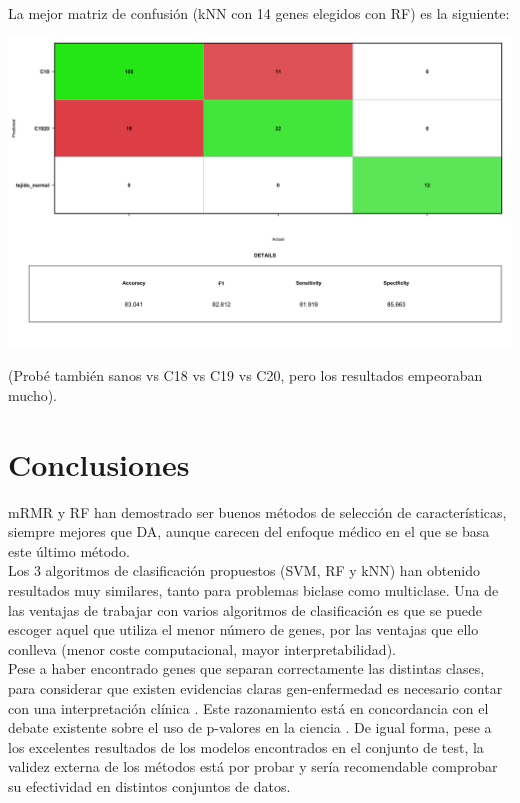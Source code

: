 La mejor matriz de confusión (kNN con 14 genes elegidos con RF) es la siguiente:

\begin{center}
	\includegraphics[width=1\textwidth]{figuras/auxiliares/cr_04_analisis_multiclase_codigo/35_knn_matriz_confusion_mejor_metodo.png} 
\end{center}

(Probé también sanos vs C18 vs C19 vs C20, pero los resultados empeoraban mucho).

\section{Conclusiones}

mRMR y RF han demostrado ser buenos métodos de selección de características, siempre mejores que DA, aunque carecen del enfoque médico en el que se basa este último método.\\

Los 3 algoritmos de clasificación propuestos (SVM, RF y kNN) han obtenido resultados muy similares, tanto para problemas biclase como multiclase. Una de las ventajas de trabajar con varios algoritmos de clasificación es que se puede escoger aquel que utiliza el menor número de genes, por las ventajas que ello conlleva (menor coste computacional, mayor interpretabilidad).\\

Pese a haber encontrado genes que separan correctamente las distintas clases, para considerar que existen evidencias claras gen-enfermedad es necesario contar con una interpretación clínica \cite{Drier2011}. Este razonamiento está en concordancia con el debate existente sobre el uso de p-valores en la ciencia \cite{Evans1988, Goodman1999, Matthews2000}. De igual forma, pese a los excelentes resultados de los modelos encontrados en el conjunto de test, la validez externa de los métodos está por probar \cite{Steckler2008} y sería recomendable comprobar su efectividad en distintos conjuntos de datos.
